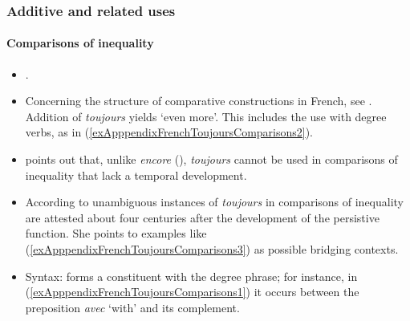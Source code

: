 \subsubsection{Additive and related uses}
\paragraph{Comparisons of inequality}\label{appendixFrenchToujoursComparisons}
\begin{itemize}
	\sloppy
	\item \textcite[164–168]{MosegaardHansen2008}.
	\item Concerning the structure of comparative constructions in French, see . Addition of \textit{toujours} yields \lq even more\rq{}. This includes the use with degree verbs, as in (\ref{exApppendixFrenchToujoursComparisons2}).
	\item \textcite[166–167]{MosegaardHansen2008} points out that, unlike \textit{encore} (), \textit{toujours} cannot be used in comparisons of inequality that lack a temporal development.
	\item According to \textcite[167]{MosegaardHansen2008} unambiguous instances of \textit{toujours} in comparisons of inequality  are attested about four centuries after the development of the persistive function. She points to  examples like (\ref{exApppendixFrenchToujoursComparisons3}) as possible bridging contexts.
	\item Syntax: forms a constituent with the degree phrase; for instance, in (\ref{exApppendixFrenchToujoursComparisons1}) it occurs between the preposition \textit{avec} \lq with\rq{ }and its complement.
\end{itemize}

